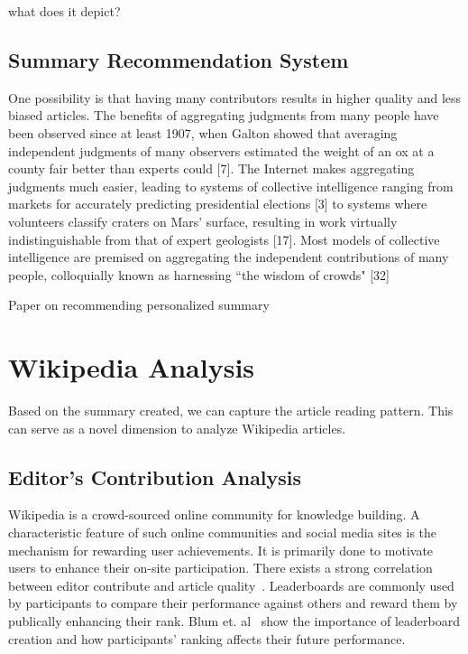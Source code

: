 \documentclass[12pt]{article}
\begin{document}
what does it depict?




\subsection{Summary Recommendation System}
    One possibility is that having many
contributors results in higher quality and less biased articles.
The benefits of aggregating judgments from many people
have been observed since at least 1907, when Galton showed
that averaging independent judgments of many observers
estimated the weight of an ox at a county fair better than
experts could [7]. The Internet makes aggregating
judgments much easier, leading to systems of collective
intelligence ranging from markets for accurately predicting
presidential elections [3] to systems where volunteers
classify craters on Mars' surface, resulting in work virtually
indistinguishable from that of expert geologists [17]. Most
models of collective intelligence are premised on
aggregating the independent contributions of many people,
colloquially known as harnessing ``the wisdom of crowds" [32]


Paper on recommending personalized summary \cite{cagliero2019recommending}

\section{Wikipedia Analysis}\label{sec:Analysis}
Based on the summary created, we can capture the article reading pattern. This can serve as a novel dimension to analyze Wikipedia articles. 

    
\subsection{Editor's Contribution Analysis}
Wikipedia is a crowd-sourced online community for knowledge building. A characteristic feature of such online communities and social media sites is the mechanism for rewarding user achievements. It is primarily done to motivate users to enhance their on-site participation. There exists a strong correlation between editor contribute and article quality~\cite{li2015automatically}. 
Leaderboards are commonly used by participants to compare their performance against others and reward them by publically enhancing their rank. Blum et. al~\cite{blum2015ladder} show the importance of leaderboard creation and how participants' ranking affects their future performance.
\end{document}
